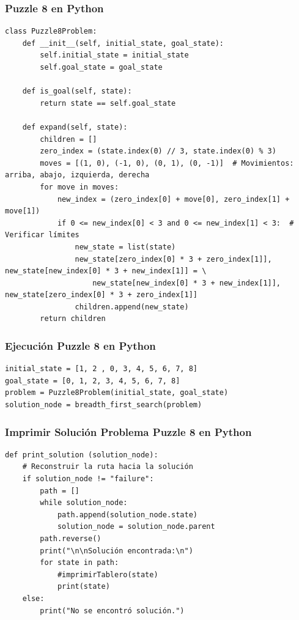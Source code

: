\documentclass[xcolor=table]{beamer}
\begin{document}
\begin{frame} [fragile ]\frametitle{Puzzle 8  en Python } \footnotesize
\begin{verbatim}
class Puzzle8Problem:
    def __init__(self, initial_state, goal_state):
        self.initial_state = initial_state
        self.goal_state = goal_state

    def is_goal(self, state):
        return state == self.goal_state

    def expand(self, state):
        children = []
        zero_index = (state.index(0) // 3, state.index(0) % 3)
        moves = [(1, 0), (-1, 0), (0, 1), (0, -1)]  # Movimientos: arriba, abajo, izquierda, derecha
        for move in moves:
            new_index = (zero_index[0] + move[0], zero_index[1] + move[1])
            if 0 <= new_index[0] < 3 and 0 <= new_index[1] < 3:  # Verificar límites
                new_state = list(state)
                new_state[zero_index[0] * 3 + zero_index[1]], new_state[new_index[0] * 3 + new_index[1]] = \
                    new_state[new_index[0] * 3 + new_index[1]], new_state[zero_index[0] * 3 + zero_index[1]]
                children.append(new_state)
        return children

\end{verbatim}

\end{frame} 

\begin{frame} [fragile ]\frametitle{Ejecución Puzzle 8  en Python } \footnotesize
\begin{verbatim}
initial_state = [1, 2 , 0, 3, 4, 5, 6, 7, 8]
goal_state = [0, 1, 2, 3, 4, 5, 6, 7, 8]
problem = Puzzle8Problem(initial_state, goal_state)
solution_node = breadth_first_search(problem)

\end{verbatim}

\end{frame} 

\begin{frame} [fragile ]\frametitle{Imprimir Solución Problema Puzzle 8  en Python } \footnotesize
\begin{verbatim}
def print_solution (solution_node):
    # Reconstruir la ruta hacia la solución
    if solution_node != "failure":
        path = []
        while solution_node:
            path.append(solution_node.state)
            solution_node = solution_node.parent
        path.reverse()
        print("\n\nSolución encontrada:\n")
        for state in path:
            #imprimirTablero(state)
            print(state)
    else:
        print("No se encontró solución.")

\end{verbatim}

\end{frame} 
\end{document}
